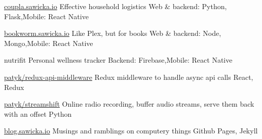 
\begin{cvprojects}

	\cvproject
		{\href{http://coupla.sawicka.io}{coupla.sawicka.io}}
		{Effective household logistics}
		{Web \& backend: Python, Flask,\newline Mobile: React Native}

	\cvproject
		{\href{http://bookworm.sawicka.io}{bookworm.sawicka.io}}
		{Like Plex, but for books}
		{Web \& backend: Node, Mongo,\newline Mobile: React Native}

	\cvproject
		{nutrifit}
		{Personal wellness tracker}
		{Backend: Firebase,\newline Mobile: React Native}

	\cvproject
		{\faGithub\acvHeaderIconSep \href{https://github.com/patyk/redux-api-middleware}{patyk/redux-api-middleware}}
		{Redux middleware to handle async api calls}
		{React, Redux}

	\cvproject
		{\faGithub\acvHeaderIconSep \href{https://github.com/patyk/streamshift}{patyk/streamshift}}
		{Online radio recording, buffer audio streams, serve them back with an offset}
		{Python}

	\cvproject
		{\faGithub\acvHeaderIconSep \href{http://blog.sawicka.io}{blog.sawicka.io}}
		{Musings and ramblings on computery things}
		{Github Pages, Jekyll}

\end{cvprojects}
